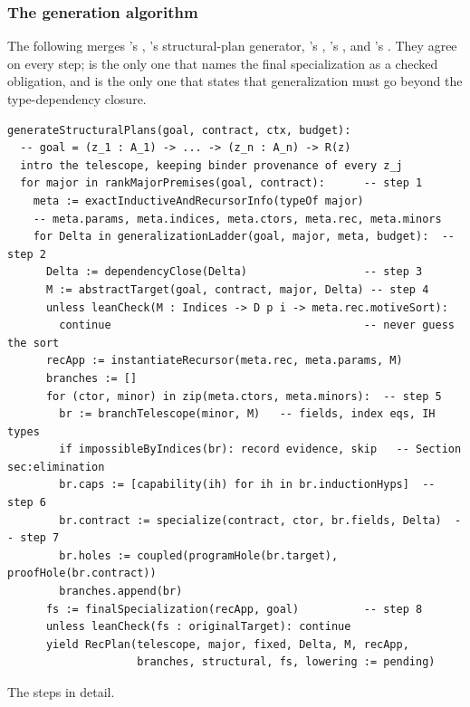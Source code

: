 \subsubsection{The generation algorithm}

The following merges 's , 's structural-plan generator, 's , 's , and 's . They agree on every step;  is the only one that names the final specialization as a checked obligation, and  is the only one that states that generalization must go beyond the type-dependency closure.

\begin{lstlisting}
generateStructuralPlans(goal, contract, ctx, budget):
  -- goal = (z_1 : A_1) -> ... -> (z_n : A_n) -> R(z)
  intro the telescope, keeping binder provenance of every z_j
  for major in rankMajorPremises(goal, contract):      -- step 1
    meta := exactInductiveAndRecursorInfo(typeOf major)
    -- meta.params, meta.indices, meta.ctors, meta.rec, meta.minors
    for Delta in generalizationLadder(goal, major, meta, budget):  -- step 2
      Delta := dependencyClose(Delta)                  -- step 3
      M := abstractTarget(goal, contract, major, Delta) -- step 4
      unless leanCheck(M : Indices -> D p i -> meta.rec.motiveSort):
        continue                                       -- never guess the sort
      recApp := instantiateRecursor(meta.rec, meta.params, M)
      branches := []
      for (ctor, minor) in zip(meta.ctors, meta.minors):  -- step 5
        br := branchTelescope(minor, M)   -- fields, index eqs, IH types
        if impossibleByIndices(br): record evidence, skip   -- Section sec:elimination
        br.caps := [capability(ih) for ih in br.inductionHyps]  -- step 6
        br.contract := specialize(contract, ctor, br.fields, Delta)  -- step 7
        br.holes := coupled(programHole(br.target), proofHole(br.contract))
        branches.append(br)
      fs := finalSpecialization(recApp, goal)          -- step 8
      unless leanCheck(fs : originalTarget): continue
      yield RecPlan(telescope, major, fixed, Delta, M, recApp,
                    branches, structural, fs, lowering := pending)
\end{lstlisting}

The steps in detail.

